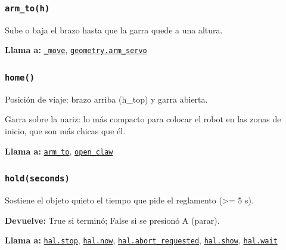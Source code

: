 \subsubsection{\texttt{arm\_\allowbreak{}to(h)}}\label{fn:gripper:arm-to}
\noindent Sube o baja el brazo hasta que la garra quede a una altura.

\par{}\par\smallskip
\noindent\textbf{Llama a:} \hyperref[fn:gripper:-move]{\texttt{\_\allowbreak{}move}}, \hyperref[fn:geometry:arm-servo]{\texttt{geometry.arm\_\allowbreak{}servo}}\par

\subsubsection{\texttt{home()}}\label{fn:gripper:home}
\noindent Posición de viaje: brazo arriba (h\_top) y garra abierta.

Garra sobre la nariz: lo más compacto para colocar el robot en las zonas de inicio, que son más chicas que él.

\noindent\textbf{Llama a:} \hyperref[fn:gripper:arm-to]{\texttt{arm\_\allowbreak{}to}}, \hyperref[fn:gripper:open-claw]{\texttt{open\_\allowbreak{}claw}}\par

\subsubsection{\texttt{hold(seconds)}}\label{fn:gripper:hold}
\noindent Sostiene el objeto quieto el tiempo que pide el reglamento (>= 5 s).

\par{}\par\smallskip
\noindent\textbf{Devuelve:} True si terminó; False si se presionó A (parar).\par
\noindent\textbf{Llama a:} \hyperref[fn:hal:stop]{\texttt{hal.stop}}, \hyperref[fn:hal:now]{\texttt{hal.now}}, \hyperref[fn:hal:abort-requested]{\texttt{hal.abort\_\allowbreak{}requested}}, \hyperref[fn:hal:show]{\texttt{hal.show}}, \hyperref[fn:hal:wait]{\texttt{hal.wait}}\par

